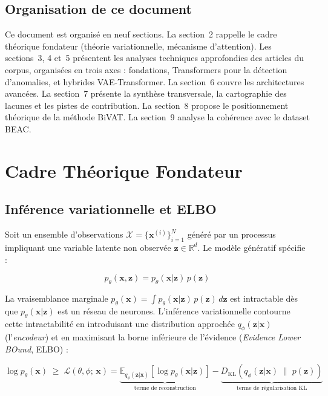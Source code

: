 \documentclass[12pt,a4paper]{article}
\begin{document}
\subsection{Organisation de ce document}

Ce document est organisé en neuf sections. La section~2 rappelle le cadre théorique fondateur (théorie variationnelle, mécanisme d'attention). Les sections~3, 4 et~5 présentent les analyses techniques approfondies des articles du corpus, organisées en trois axes : fondations, Transformers pour la détection d'anomalies, et hybrides VAE-Transformer. La section~6 couvre les architectures avancées. La section~7 présente la synthèse transversale, la cartographie des lacunes et les pistes de contribution. La section~8 propose le positionnement théorique de la méthode BiVAT. La section~9 analyse la cohérence avec le dataset BEAC.

\section{Cadre Théorique Fondateur}

\subsection{Inférence variationnelle et ELBO}

Soit un ensemble d'observations $\mathcal{X} = \{\mathbf{x}^{(i)}\}_{i=1}^{N}$ généré par un processus impliquant une variable latente non observée $\mathbf{z} \in \mathbb{R}^d$. Le modèle génératif spécifie :

$$p_\theta(\mathbf{x}, \mathbf{z}) = p_\theta(\mathbf{x}|\mathbf{z})\,p(\mathbf{z})$$

La vraisemblance marginale $p_\theta(\mathbf{x}) = \int p_\theta(\mathbf{x}|\mathbf{z})\,p(\mathbf{z})\,d\mathbf{z}$ est intractable dès que $p_\theta(\mathbf{x}|\mathbf{z})$ est un réseau de neurones. L'inférence variationnelle contourne cette intractabilité en introduisant une distribution approchée $q_\phi(\mathbf{z}|\mathbf{x})$ (l'\textit{encodeur}) et en maximisant la borne inférieure de l'évidence (\textit{Evidence Lower BOund}, ELBO) :

$$\log p_\theta(\mathbf{x}) \;\geq\; \mathcal{L}(\theta, \phi;\,\mathbf{x}) = \underbrace{\mathbb{E}_{q_\phi(\mathbf{z}|\mathbf{x})}\!\left[\log p_\theta(\mathbf{x}|\mathbf{z})\right]}_{\text{terme de reconstruction}} - \underbrace{D_{\mathrm{KL}}\!\left(q_\phi(\mathbf{z}|\mathbf{x}) \;\|\; p(\mathbf{z})\right)}_{\text{terme de régularisation KL}}$$
\end{document}
